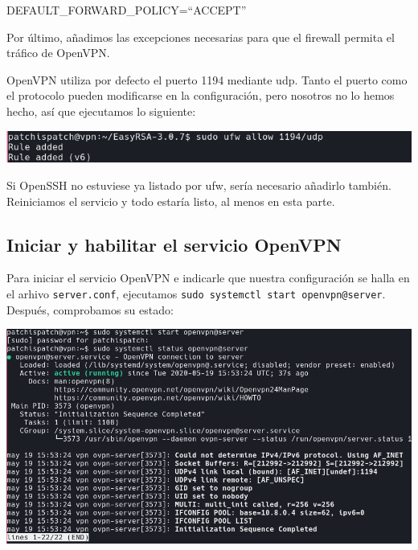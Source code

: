\documentclass[11pt,a4paper]{article}
\begin{document}
\medskip

DEFAULT\_FORWARD\_POLICY=``ACCEPT''

\bigskip

Por último, añadimos las excepciones necesarias para que el firewall permita el tráfico de OpenVPN.

\medskip

OpenVPN utiliza por defecto el puerto 1194 mediante udp. Tanto el puerto como el protocolo pueden modificarse en la configuración, pero nosotros no lo hemos hecho, así que ejecutamos lo siguiente:

\medskip

\begin{center}
\includegraphics[scale=0.4]{ufw-allow-1194.png}
\end{center}

\medskip

Si OpenSSH no estuviese ya listado por ufw, sería necesario añadirlo también. Reiniciamos el servicio y todo estaría listo, al menos en esta parte.

\newpage

\subsection{Iniciar y habilitar el servicio OpenVPN}

Para iniciar el servicio OpenVPN e indicarle que nuestra configuración se halla en el arhivo \texttt{server.conf}, ejecutamos \texttt{sudo systemctl start openvpn@server}. Después, comprobamos su estado:

\medskip

\begin{center}
\includegraphics[scale=0.4]{start-openvpn.png}
\end{center}
\end{document}
